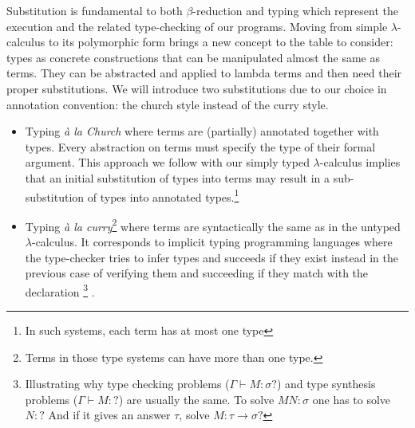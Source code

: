 \documentclass{article}
\begin{document}
    
    Substitution is fundamental to both $\beta$-reduction and typing which represent the execution and the related type-checking of our programs. Moving from simple $\lambda$-calculus to its polymorphic form brings a new concept to the table to consider: types as concrete constructions that can be manipulated almost the same as terms. They can be abstracted and applied to lambda terms and then need their proper substitutions. We will introduce two substitutions due to our choice in annotation convention: the church style instead of the curry style.
    \begin{itemize}
        \item Typing \textit{à la Church} where terms are (partially) annotated together with types. Every abstraction on terms must specify the type of their formal argument. This approach we follow with our simply typed $\lambda$-calculus implies that an initial substitution of types into terms may result in a sub-substitution of types into annotated types.\footnote{In such systems, each term has at most one type}

        \item Typing \textit{à la curry}\footnote{Terms in those type systems can have more than one type.} where terms are syntactically the same as in the untyped $\lambda$-calculus. It corresponds to implicit typing programming languages where the type-checker tries to infer types and succeeds if they exist instead in the previous case of verifying them and succeeding if they match with the declaration
        \footnote{Illustrating why type checking problems ($\Gamma\vdash M : \sigma ?$) and type synthesis problems ($\Gamma\vdash M :  ?$) are usually the same. To solve $M N : \sigma$ one has to solve $N : ?$ And if it gives an answer $\tau$, solve $M:\tau\rightarrow\sigma ?$}
        .
    \end{itemize}
\end{document}
